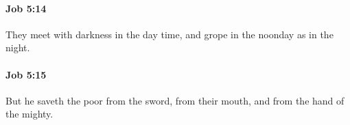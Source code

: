 		\paragraph{Job 5:14} %
			\label{JOB-5-14}

			They meet with darkness in the day time, and grope in the noonday as in the night.


		\paragraph{Job 5:15} %
			\label{JOB-5-15}

			But he saveth the poor from the sword, from their mouth, and from the hand of the mighty.


